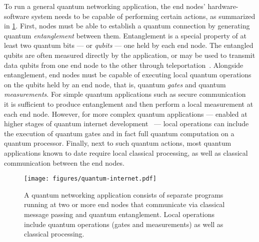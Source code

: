To run a general quantum networking application, the end nodes' hardware-software system needs to be
capable of performing certain actions, as summarized in \cref{fig:quantum-internet}. First, nodes
must be able to establish a quantum connection by generating quantum \emph{entanglement} between
them. Entanglement is a special property of at least two quantum bits --- or \emph{qubits} --- one
held by each end node. The entangled qubits are often measured directly by the application, or may
be used to transmit data qubits from one end node to the other through
teleportation~\cite{bennett_1993_teleportation}. Alongside entanglement, end nodes must be capable
of executing local quantum operations on the qubits held by an end node, that is, quantum
\emph{gates} and quantum \emph{measurements}. For simple quantum applications such as secure
communication~\cite{ekert_1991_e91, bennett_2014_bb84} it is sufficient to produce entanglement and
then perform a local measurement at each end node. However, for more complex quantum applications
--- enabled at higher stages of quantum internet development~\cite{wehner_2018_stages} --- local
operations can include the execution of quantum gates and in fact full quantum computation on a
quantum processor. Finally, next to such quantum actions, most quantum applications known to date
require local classical processing, as well as classical communication between the end nodes.

\begin{figure}[b]
    \centering
    \texttt{[image: figures/quantum-internet.pdf]}
    \caption{
        A quantum networking application consists of separate programs running at two or more end
        nodes that communicate via classical message passing and quantum entanglement. Local
        operations include quantum operations (gates and measurements) as well as classical
        processing.
    }
    \label{fig:quantum-internet}
\end{figure}

